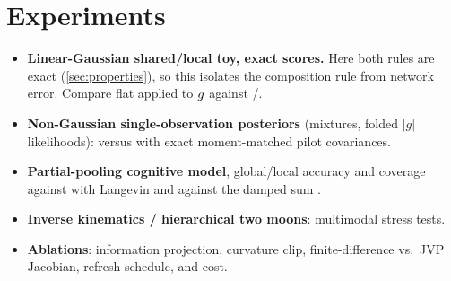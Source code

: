 \section{Experiments}\label{sec:exp}
\begin{itemize}
  \item \textbf{Linear-Gaussian shared/local toy, exact scores.} Here both rules are exact (\cref{sec:properties}), so this isolates the composition rule from network error. Compare flat \gauss{} applied to $g$ against \arrowm/\quiver.
  \item \textbf{Non-Gaussian single-observation posteriors} (mixtures, folded $|g|$ likelihoods): \quiver{} versus \arrowm{} with exact moment-matched pilot covariances.
  \item \textbf{Partial-pooling cognitive model}, global/local accuracy and coverage against \fnpse{} with Langevin and against the damped sum \citep{arruda2025compositional}.
  \item \textbf{Inverse kinematics / hierarchical two moons}: multimodal stress tests.
  \item \textbf{Ablations}: information projection, curvature clip, finite-difference vs.\ JVP Jacobian, refresh schedule, and cost.
\end{itemize}
